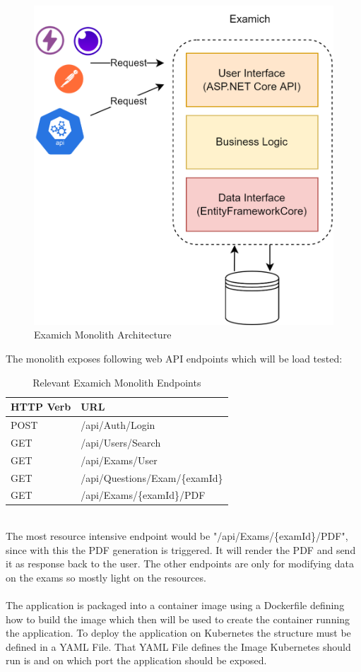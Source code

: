 \documentclass[BIF,Bachelor,nenglish]{twbook}%
\begin{document}
\begin{figure} [H]
 \begin{center}
    \includegraphics[width=0.6\linewidth]{img/ExamichMonolith.png}
 \end{center}
 \caption{Examich Monolith Architecture}
 \label{examichMonolith}
\end{figure}

\noindent
The monolith exposes following web \ac{API} endpoints which will be load tested:

\begin{table}[!ht]
    \centering
    \begin{tabular}{|l|l|}
    \hline
        \ac{HTTP} Verb & URL \\ \hline
        POST & /api/Auth/Login \\ \hline
        GET & /api/Users/Search \\ \hline
        GET & /api/Exams/User \\ \hline
        GET & /api/Questions/Exam/\{examId\} \\ \hline
        GET & /api/Exams/\{examId\}/PDF \\ \hline
    \end{tabular}
 \caption{Relevant Examich Monolith Endpoints}
 \label{examichMonolithEndpoints}
\end{table}
\noindent
\\
The most resource intensive endpoint would be "/api/Exams/\{examId\}/PDF", since with this the PDF generation is triggered. It will render the PDF and send it as response back to the user. The other endpoints are only for modifying data on the exams so mostly light on the resources.
\\
\\
\noindent
The application is packaged into a container image using a Dockerfile defining how to build the image which then will be used to create the container running the application. To deploy the application on Kubernetes the structure must be defined in a YAML File. That YAML File defines the Image Kubernetes should run is and on which port the application should be exposed.
\end{document}
